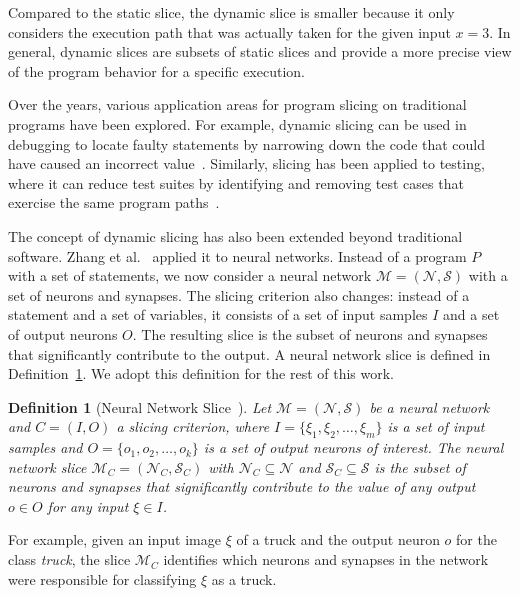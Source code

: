 \documentclass[
12pt,
fancyheadings,
a4paper,
twoside,
BCOR=0.7cm,
nobcorignoretitle,
grayscalebody,
]{stsreprt}
\newtheorem{definition}{Definition}[chapter]
\begin{document}
Compared to the static slice, the dynamic slice is smaller because it only considers the execution
path that was actually taken for the given input $x = 3$.
In general, dynamic slices are subsets of static slices and provide a more precise view of the
program behavior for a specific execution.

Over the years, various application areas for program slicing on traditional programs have been
explored.
For example, dynamic slicing can be used in debugging to locate faulty statements by narrowing down
the code that could have caused an incorrect value~\cite{agrawal1993debugging}.
Similarly, slicing has been applied to testing, where it can reduce test suites by identifying and
removing test cases that exercise the same program paths~\cite{arlt2014reducing}.

The concept of dynamic slicing has also been extended beyond traditional software. Zhang et
al.~\cite{zhang2020dynamic} applied it to neural networks.
Instead of a program $P$ with a set of statements, we now consider a neural network $\mathcal{M} =
(\mathcal{N}, \mathcal{S})$ with a set of neurons and synapses.
The slicing criterion also changes: instead of a statement and a set of variables, it consists of a
set of input samples $I$ and a set of output neurons $O$.
The resulting slice is the subset of neurons and synapses that significantly contribute to the
output.
A neural network slice is defined in Definition~\ref{def:nn_slice}. We adopt this definition for
the rest of this work.


\begin{definition}[Neural Network Slice~\cite{zhang2020dynamic}]
\label{def:nn_slice}
Let $\mathcal{M} = (\mathcal{N}, \mathcal{S})$ be a neural network and $C = (I, O)$ a slicing
criterion, where $I = \{\xi_1, \xi_2, \dots, \xi_m\}$ is a set of input samples and $O = \{o_1,
o_2, \dots, o_k\}$ is a set of output neurons of interest.
The neural network slice $\mathcal{M}_C = (\mathcal{N}_C, \mathcal{S}_C)$ with $\mathcal{N}_C
\subseteq \mathcal{N}$ and $\mathcal{S}_C \subseteq \mathcal{S}$ is the subset of neurons and
synapses that significantly contribute to the value of any output $o \in O$ for any input $\xi \in
I$.
\end{definition}

For example, given an input image $\xi$ of a truck and the output neuron $o$ for the class
\textit{truck}, the slice $\mathcal{M}_C$ identifies which neurons and synapses in the network were
responsible for classifying $\xi$ as a truck.
\end{document}
